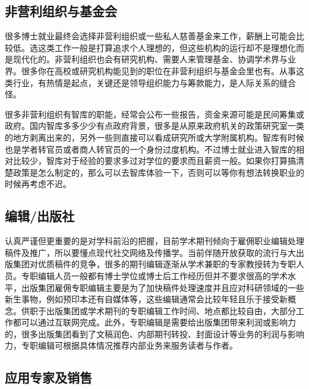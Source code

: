 \documentclass[]{tufte-book}
\begin{document}
\hypertarget{ux975eux8425ux5229ux7ec4ux7ec7ux4e0eux57faux91d1ux4f1a}{%
\subsection{非营利组织与基金会}\label{ux975eux8425ux5229ux7ec4ux7ec7ux4e0eux57faux91d1ux4f1a}}

很多博士就业最终会选择非营利组织或一些私人慈善基金来工作，薪酬上可能会比较低。选这类工作一般是打算追求个人理想的，但这些机构的运行却不是理想化而是现代化的。非营利组织也会有研究机构、需要人来管理基金、协调学术界与业界。很多你在高校或研究机构能见到的职位在非营利组织与基金会里也有。从事这类行业，有热情是起点，关键还是领导组织能力与筹款能力，是人际关系的缝合怪。

很多非营利组织有智库的职能，经常会公布一些报告，资金来源可能是民间筹集或政府。国内智库多多少少有点政府背景，很多是从原来政府机关的政策研究室一类的地方剥离出来的，另外一些则直接可以看成研究所或大学附属机构。智库有时候也是学者转官员或者商人转官员的一个身份过度机构。不过博士就业进入智库的相对比较少，智库对于经验的要求多过对学位的要求而且薪资一般。如果你打算搞清楚政策是怎么制定的，那么可以去智库体验一下，否则可以等你有想法转换职业的时候再考虑不迟。

\hypertarget{ux7f16ux8f91ux51faux7248ux793e}{%
\subsection{编辑/出版社}\label{ux7f16ux8f91ux51faux7248ux793e}}

认真严谨但更重要的是对学科前沿的把握，目前学术期刊倾向于雇佣职业编辑处理稿件及推广，所以要懂点现代社交网络及传播学。当前伴随开放获取的流行与大出版集团对优质稿件的竞争，很多的期刊编辑逐渐从学术兼职的专家教授转为专职人员。专职编辑人员一般都有博士学位或博士后工作经历但并不要求很高的学术水平，出版集团雇佣专职编辑主要是为了加快稿件处理速度并且应对科研领域的一些新生事物，例如预印本还有自媒体等，这些编辑通常会比较年轻且乐于接受新概念。供职于出版集团或学术期刊的专职编辑工作时间、地点都比较自由，大部分工作都可以通过互联网完成。此外，专职编辑是需要给出版集团带来利润或影响力的，很多出版集团看到了文稿润色、内部期刊转投、封面设计等业务的利润与影响力，专职编辑可根据具体情况推荐内部业务来服务读者与作者。

\hypertarget{ux5e94ux7528ux4e13ux5bb6ux53caux9500ux552e}{%
\subsection{应用专家及销售}\label{ux5e94ux7528ux4e13ux5bb6ux53caux9500ux552e}}
\end{document}
